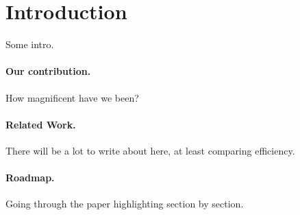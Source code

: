 \section{Introduction}\label{sec:introduction}
Some intro.

\paragraph{Our contribution.}
How magnificent have we been?

\paragraph{Related Work.}
There will be a lot to write about here, at least comparing efficiency.

\paragraph{Roadmap.}
Going through the paper highlighting section by section.
